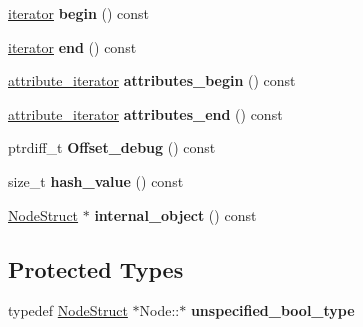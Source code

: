 \begin{DoxyCompactItemize}
\item 
\hypertarget{classphys_1_1xml_1_1Node_a78c82f35dcf7b2c37f1f5ff37d526329}{
\hyperlink{classphys_1_1xml_1_1NodeIterator}{iterator} {\bfseries begin} () const }
\label{d7/d0a/classphys_1_1xml_1_1Node_a78c82f35dcf7b2c37f1f5ff37d526329}

\item 
\hypertarget{classphys_1_1xml_1_1Node_ae69ca8be6e9eb53a4faf8bb50a2996d6}{
\hyperlink{classphys_1_1xml_1_1NodeIterator}{iterator} {\bfseries end} () const }
\label{d7/d0a/classphys_1_1xml_1_1Node_ae69ca8be6e9eb53a4faf8bb50a2996d6}

\item 
\hypertarget{classphys_1_1xml_1_1Node_a601285bed116eb5d63cea9a8d117e5b7}{
\hyperlink{classphys_1_1xml_1_1AttributeIterator}{attribute\_\-iterator} {\bfseries attributes\_\-begin} () const }
\label{d7/d0a/classphys_1_1xml_1_1Node_a601285bed116eb5d63cea9a8d117e5b7}

\item 
\hypertarget{classphys_1_1xml_1_1Node_a9af9e0bff5b8ed06bc40861dccb6b4ec}{
\hyperlink{classphys_1_1xml_1_1AttributeIterator}{attribute\_\-iterator} {\bfseries attributes\_\-end} () const }
\label{d7/d0a/classphys_1_1xml_1_1Node_a9af9e0bff5b8ed06bc40861dccb6b4ec}

\item 
\hypertarget{classphys_1_1xml_1_1Node_a6439833c334aa4d4dd3032609d697497}{
ptrdiff\_\-t {\bfseries Offset\_\-debug} () const }
\label{d7/d0a/classphys_1_1xml_1_1Node_a6439833c334aa4d4dd3032609d697497}

\item 
\hypertarget{classphys_1_1xml_1_1Node_ad759e1e8c2c131e7ed438ce6308fd79b}{
size\_\-t {\bfseries hash\_\-value} () const }
\label{d7/d0a/classphys_1_1xml_1_1Node_ad759e1e8c2c131e7ed438ce6308fd79b}

\item 
\hypertarget{classphys_1_1xml_1_1Node_a911d3691004d14cb60dcefbe85c41046}{
\hyperlink{structphys_1_1xml_1_1NodeStruct}{NodeStruct} $\ast$ {\bfseries internal\_\-object} () const }
\label{d7/d0a/classphys_1_1xml_1_1Node_a911d3691004d14cb60dcefbe85c41046}

\end{DoxyCompactItemize}
\subsection*{Protected Types}
\begin{DoxyCompactItemize}
\item 
\hypertarget{classphys_1_1xml_1_1Node_abace2c2c7e70431d920579917417c1e4}{
typedef \hyperlink{structphys_1_1xml_1_1NodeStruct}{NodeStruct} $\ast$Node::$\ast$ {\bfseries unspecified\_\-bool\_\-type}}
\label{d7/d0a/classphys_1_1xml_1_1Node_abace2c2c7e70431d920579917417c1e4}

\end{DoxyCompactItemize}
